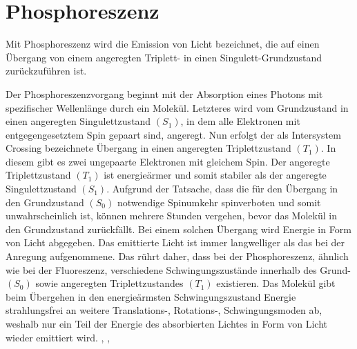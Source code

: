 \section{Phosphoreszenz}

Mit Phosphoreszenz wird die Emission von Licht bezeichnet, die auf einen Übergang von einem angeregten Triplett- in einen Singulett-Grundzustand zurückzuführen ist. 

Der Phosphoreszenzvorgang beginnt mit der Absorption eines Photons mit spezifischer Wellenlänge durch ein Molekül. Letzteres wird vom Grundzustand in einen angeregten Singulettzustand $(S_1)$, in dem alle Elektronen mit entgegengesetztem Spin gepaart sind, angeregt. Nun erfolgt der als Intersystem Crossing bezeichnete Übergang in einen angeregten Triplettzustand $(T_1)$. In diesem gibt es zwei ungepaarte Elektronen mit gleichem Spin. Der angeregte Triplettzustand $(T_1)$ ist energieärmer und somit stabiler als der angeregte Singulettzustand $(S_1)$. Aufgrund der Tatsache, dass die für den Übergang in den Grundzustand $(S_0)$ notwendige Spinumkehr spinverboten und somit unwahrscheinlich ist, können mehrere Stunden vergehen, bevor das Molekül in den Grundzustand zurückfällt. Bei einem solchen Übergang wird Energie in Form von Licht abgegeben. Das emittierte Licht ist immer langwelliger als das bei der Anregung aufgenommene. Das rührt daher, dass bei der Phosphoreszenz, ähnlich wie bei der Fluoreszenz, verschiedene Schwingungszustände innerhalb des Grund- $(S_0)$ sowie angeregten Triplettzustandes $(T_1)$ existieren. Das Molekül gibt beim Übergehen in den energieärmsten Schwingungszustand Energie strahlungsfrei an weitere Translations-, Rotations-, Schwingungsmoden ab, weshalb nur ein Teil der Energie des absorbierten Lichtes in Form von Licht wieder emittiert wird. 
\cite{Phosphoreszenz1}, \cite{Phosphoreszenz2}, \cite{Phosphoreszenz3}
